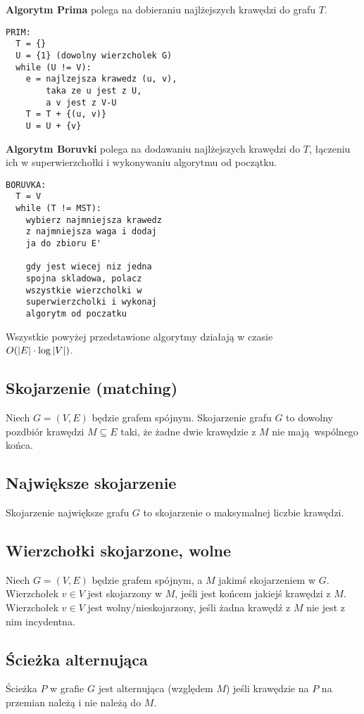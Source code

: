 \textbf{Algorytm Prima} polega na dobieraniu najlżejszych krawędzi do grafu $T$.
\begin{lstlisting}[style=code]
PRIM:
  T = {}
  U = {1} (dowolny wierzcholek G)
  while (U != V):
    e = najlzejsza krawedz (u, v),
        taka ze u jest z U, 
        a v jest z V-U
    T = T + {(u, v)}  
    U = U + {v}
\end{lstlisting}

\textbf{Algorytm Boruvki} polega na dodawaniu najlżejszych krawędzi do $T$, łączeniu
ich w superwierzchołki i wykonywaniu algorytmu od początku.
\begin{lstlisting}[style=code]
BORUVKA:
  T = V
  while (T != MST):
    wybierz najmniejsza krawedz
    z najmniejsza waga i dodaj
    ja do zbioru E'

    gdy jest wiecej niz jedna
    spojna skladowa, polacz 
    wszystkie wierzcholki w
    superwierzcholki i wykonaj
    algorytm od poczatku
\end{lstlisting}
Wszystkie powyżej przedstawione algorytmy działają w czasie \\
$O(\left| E \right| \cdot \log \left| V \right|)$.

\subsection*{Skojarzenie (matching)}
Niech $G = (V, E)$ będzie grafem spójnym. Skojarzenie grafu $G$ to dowolny pozdbiór
krawędzi $M \subseteq E$ taki, że żadne dwie krawędzie z $M$ nie mają wspólnego końca.

\subsection*{Największe skojarzenie}
Skojarzenie największe grafu $G$ to skojarzenie o maksymalnej liczbie krawędzi.

\subsection*{Wierzchołki skojarzone, wolne}
Niech $G = (V, E)$ będzie grafem spójnym, a $M$ jakimś skojarzeniem w $G$.
Wierzchołek $v \in V$ jest skojarzony w $M$, jeśli jest końcem jakiejś krawędzi
z $M$. Wierzchołek $v \in V$ jest wolny/nieskojarzony, jeśli żadna krawędź z $M$
nie jest z nim incydentna.

\subsection*{Ścieżka alternująca}
Ścieżka $P$ w grafie $G$ jest alternująca (względem $M$) jeśli krawędzie na $P$
na przemian należą i nie należą do $M$.


